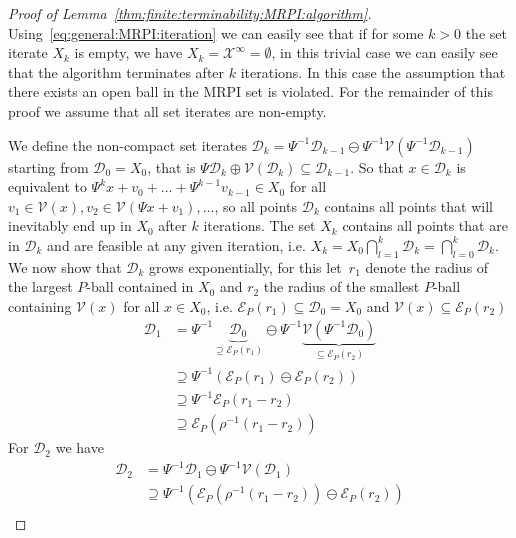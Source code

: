 \begin{proof}[Proof of Lemma~\ref{thm:finite:terminability:MRPI:algorithm}]
Using~\eqref{eq:general:MRPI:iteration} we can easily see that if for some $k>0$
the set iterate $X_k$ is empty, we have $X_k=\mathcal X^\infty = \emptyset$,
in this trivial case we can easily see that the algorithm terminates after $k$ iterations.
%
In this case the assumption that there exists an open ball in the MRPI set is violated.
%
For the remainder of this proof we assume that all set iterates are non-empty.

We define the non-compact set iterates $\mathscr D_k = \Psi^{-1}\mathscr D_{k-1}\ominus \Psi^{-1}\mathcal V(\Psi^{-1}
\mathscr D_{k-1})$ starting from $\mathscr D_0 = X_0$, that is $\Psi\mathscr D_k\oplus \mathcal V(\mathscr D_k)
\subseteq\mathscr D_{k-1}$.
%
So that $x\in\mathscr D_k$ is equivalent to $\Psi^k x + v_0 + \dots + \Psi^{k-1}v_{k-1}\in X_0$ for all $v_1\in\mathcal V(x), 
v_2\in\mathcal V(\Psi x + v_1),\dots$, so all points $\mathscr D_k$ contains all points that will inevitably end up 
in $X_0$ after $k$ iterations.
%
The set $X_k$ contains all points that are in $\mathscr D_k$ and are feasible at any given iteration, 
i.e. $X_k=X_0\bigcap_{l=1}^k\mathscr D_k=\bigcap_{l=0}^k\mathscr D_k$.
%
We now show that $\mathscr D_k$ grows exponentially, for this let~$r_1$ denote the radius of the largest $P$-ball 
contained in $X_0$ and $r_2$ the radius of the smallest $P$-ball containing $\mathcal V(x)$ for all $x\in X_0$, i.e.
$\mathcal E_P(r_1)\subseteq\mathscr D_0 = X_0$ and $\mathcal V(x)\subseteq\mathcal E_P(r_2)$
%
\begin{equation}\begin{split}
	\mathscr D_1 &= \Psi^{-1}\underbrace{\mathscr D_0}_{\supseteq\mathcal E_P(r_1)}
	\ominus\Psi^{-1}\underbrace{\mathcal V(\Psi^{-1}\mathscr D_0)}_{\subseteq \mathcal E_P(r_2)}\\
	&\supseteq\Psi^{-1}(\mathcal E_P(r_1)\ominus\mathcal E_P(r_2))\\
	&\supseteq\Psi^{-1}\mathcal E_P(r_1-r_2)\\
	&\supseteq\mathcal E_P(\rho^{-1}(r_1-r_2))
\end{split}\end{equation}
%
For $\mathscr D_2$ we have 
%
\begin{equation}\begin{split}
	\mathscr D_2&=\Psi^{-1}\mathscr D_1\ominus \Psi^{-1}\mathcal V(\mathscr D_1)\\
	&\supseteq\Psi^{-1}\left(\mathcal E_P(\rho^{-1}(r_1-r_2))\ominus \mathcal E_P(r_2)\right)\\

\end{split}
\end{equation}
\end{proof}
